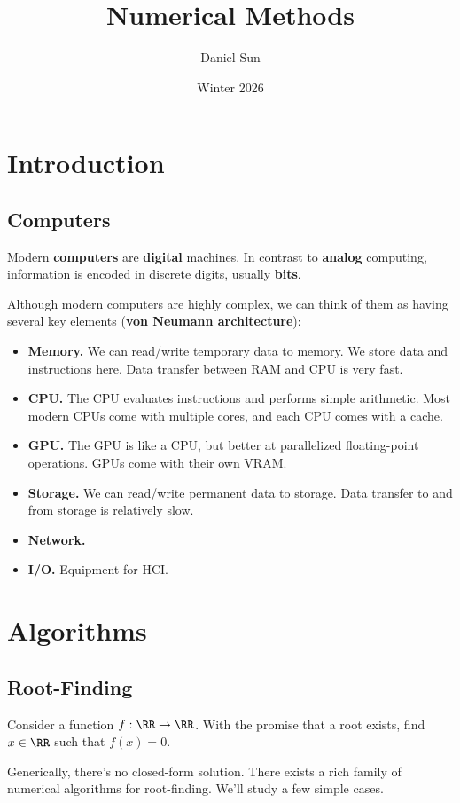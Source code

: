 \documentclass[12pt,letterpaper]{article}
\title{Numerical Methods}
\author{Daniel Sun}
\date{Winter 2026}
\begin{document}
\maketitle

\renewcommand\arraystretch{1.5}

\tableofcontents
\listoftheorems
\newpage
\section{Introduction}
\subsection{Computers}
Modern \textbf{computers} are \textbf{digital} machines. In contrast to \textbf{analog} computing, information is encoded in discrete digits, usually \textbf{bits}.

Although modern computers are highly complex, we can think of them as having several key elements (\textbf{von Neumann architecture}):
\begin{itemize}
    \item \textbf{Memory.} We can read/write temporary data to memory. We store data and instructions here. Data transfer between RAM and CPU is very fast.
    \item \textbf{CPU.} The CPU evaluates instructions and performs simple arithmetic. Most modern CPUs come with multiple cores, and each CPU comes with a cache.
    \item \textbf{GPU.} The GPU is like a CPU, but better at parallelized floating-point operations. GPUs come with their own VRAM.
    \item \textbf{Storage.} We can read/write permanent data to storage. Data transfer to and from storage is relatively slow.
    \item \textbf{Network.}
    \item \textbf{I/O.} Equipment for HCI.
\end{itemize}

\section{Algorithms}
\subsection{Root-Finding}
\begin{problem}
    Consider a function $f:\RR\to\RR$. With the promise that a root exists, find $x\in\RR$ such that $f(x)=0$.
\end{problem}
Generically, there's no closed-form solution. There exists a rich family of numerical algorithms for root-finding. We'll study a few simple cases.
\end{document}
